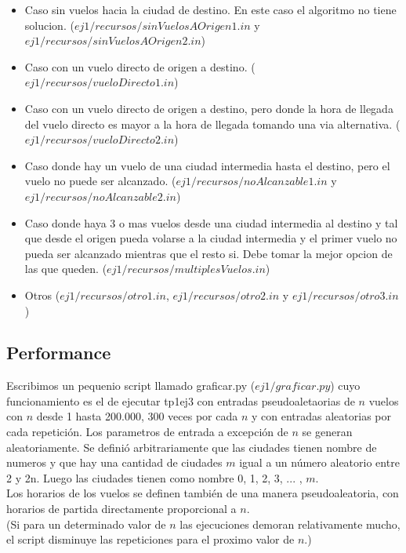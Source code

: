 \begin{itemize}

\item Caso sin vuelos hacia la ciudad de destino. En este caso el algoritmo no tiene solucion. ($ej1/recursos/sinVuelosAOrigen1.in$ y $ej1/recursos/sinVuelosAOrigen2.in$)
\item Caso con un vuelo directo de origen a destino. ($ej1/recursos/vueloDirecto1.in$)
\item Caso con un vuelo directo de origen a destino, pero donde la hora de llegada del vuelo directo es mayor a la hora de llegada tomando una via alternativa. ($ej1/recursos/vueloDirecto2.in$)
\item Caso donde hay un vuelo de una ciudad intermedia hasta el destino, pero el vuelo no puede ser alcanzado. ($ej1/recursos/noAlcanzable1.in$ y $ej1/recursos/noAlcanzable2.in$)
\item Caso donde haya 3 o mas vuelos desde una ciudad intermedia al destino y tal que desde el origen pueda volarse a la ciudad intermedia y el primer vuelo no pueda ser alcanzado mientras que el resto si. Debe tomar la mejor opcion de las que queden. ($ej1/recursos/multiplesVuelos.in$)
\item Otros ($ej1/recursos/otro1.in$, $ej1/recursos/otro2.in$ y $ej1/recursos/otro3.in$)

\end{itemize}


\subsection{Performance}

\noindent 
Escribimos un pequenio script llamado graficar.py ($ej1/graficar.py$) cuyo funcionamiento es el de ejecutar tp1ej3 con entradas pseudoaletaorias de $n$ vuelos con $n$ desde 1 hasta 200.000, 300 veces por cada $n$ y con entradas aleatorias por cada repetici\'on. Los parametros de entrada a excepci\'on de $n$ se generan aleatoriamente. Se defini\'o arbitrariamente que las ciudades tienen nombre de numeros y que hay una cantidad de ciudades $m$ igual a un n\'umero aleatorio entre 2 y 2n. Luego las ciudades tienen como nombre 0, 1, 2, 3, ... , $m$. \\
Los horarios de los vuelos se definen tambi\'en de una manera pseudoaleatoria, con horarios de partida directamente proporcional a $n$. \\
(Si para un determinado valor de $n$ las ejecuciones demoran relativamente mucho, el script disminuye las repeticiones para el proximo valor de $n$.) \\

